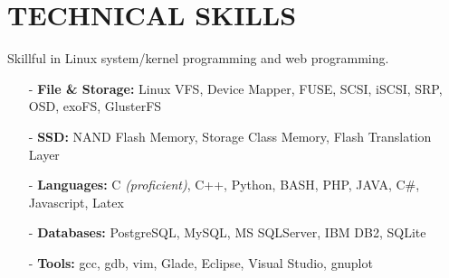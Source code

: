 \section{TECHNICAL SKILLS}
\vspace{0.03in}
Skillful in Linux system/kernel programming and web programming.
\begin{itemize}[leftmargin=*]
\setlength\itemsep{-0.02in}
\item[-] {\bf File \& Storage:} Linux VFS, Device Mapper, FUSE, SCSI, iSCSI, SRP, OSD,
exoFS, GlusterFS
\item[-] {\bf SSD:} NAND Flash Memory, Storage Class Memory,
	Flash Translation Layer %
\item[-] {\bf Languages:} C {\footnotesize \it (proficient)}, C++,
	Python, BASH, PHP, JAVA, C\#,
	Javascript, Latex
\item[-] {\bf Databases:} PostgreSQL, MySQL, MS SQLServer, IBM DB2, SQLite
\item[-] {\bf Tools:} gcc, gdb, vim, Glade, Eclipse, Visual Studio, gnuplot
\end{itemize}

